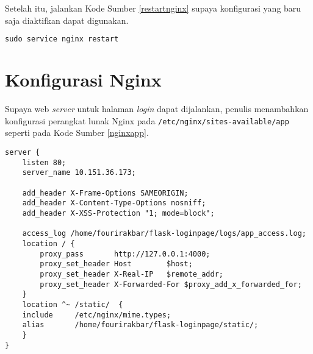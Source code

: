 Setelah itu, jalankan Kode Sumber \ref{restartnginx} supaya konfigurasi yang baru saja diaktifkan dapat digunakan.\\
\begin{lstlisting}[frame=single,tabsize=2,breaklines,captionpos=b,caption=Command untuk merestart Nginx,language=Python,label=restartnginx]
sudo service nginx restart
\end{lstlisting}

\section*{Konfigurasi Nginx}

Supaya web \textit{server} untuk halaman \textit{login} dapat dijalankan, penulis menambahkan konfigurasi perangkat lunak Nginx pada \texttt{/etc/nginx/sites-available/app} seperti pada Kode Sumber \ref{nginxapp}.

\begin{lstlisting}[frame=single,tabsize=2,breaklines,caption={Isi Berkas app},label=nginxapp, captionpos=b]
server {
	listen 80;
	server_name 10.151.36.173;
	
	add_header X-Frame-Options SAMEORIGIN;
	add_header X-Content-Type-Options nosniff;
	add_header X-XSS-Protection "1; mode=block";
	
	access_log /home/fourirakbar/flask-loginpage/logs/app_access.log;
	location / {
		proxy_pass       http://127.0.0.1:4000;
		proxy_set_header Host        $host;
		proxy_set_header X-Real-IP   $remote_addr;
		proxy_set_header X-Forwarded-For $proxy_add_x_forwarded_for;
	}
	location ^~ /static/  {
	include     /etc/nginx/mime.types;
	alias       /home/fourirakbar/flask-loginpage/static/;
	}  
}
\end{lstlisting}